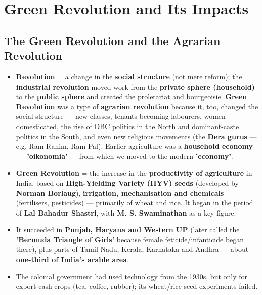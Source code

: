 \chapter{Green Revolution and Its Impacts}

\section{The Green Revolution and the Agrarian Revolution}

\begin{KeyConcept}
\begin{itemize}
\item \textbf{Revolution} = a change in the \textbf{social structure} (not mere reform); the \textbf{industrial revolution} moved work from the \textbf{private sphere (household)} to the \textbf{public sphere} and created the proletariat and bourgeoisie. \textbf{Green Revolution} was a type of \textbf{agrarian revolution} because it, too, changed the social structure --- new classes, tenants becoming labourers, women domesticated, the rise of OBC politics in the North and dominant-caste politics in the South, and even new religious movements (the \textbf{Dera gurus} --- e.g. Ram Rahim, Ram Pal). Earlier agriculture was a \textbf{household economy --- 'oikonomia'} --- from which we moved to the modern \textbf{'economy'}.
\item \textbf{Green Revolution} = the increase in the \textbf{productivity of agriculture} in India, based on \textbf{High-Yielding Variety (HYV) seeds} (developed by \textbf{Norman Borlaug}), \textbf{irrigation, mechanisation and chemicals} (fertilisers, pesticides) --- primarily of wheat and rice. It began in the period of \textbf{Lal Bahadur Shastri}, with \textbf{M. S. Swaminathan} as a key figure.
\item It succeeded in \textbf{Punjab, Haryana and Western UP} (later called the \textbf{'Bermuda Triangle of Girls'} because female feticide/infanticide began there), plus parts of Tamil Nadu, Kerala, Karnataka and Andhra --- about \textbf{one-third of India's arable area}.
\item The colonial government had used technology from the 1930s, but only for export cash-crops (tea, coffee, rubber); its wheat/rice seed experiments failed.
\end{itemize}
\end{KeyConcept}

